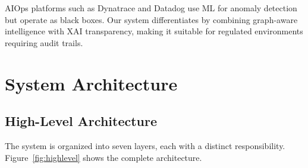 \documentclass[12pt,a4paper]{report}
\begin{document}
AIOps platforms such as Dynatrace and Datadog use ML for anomaly detection
but operate as black boxes. Our system differentiates by combining
graph-aware intelligence with XAI transparency, making it suitable for
regulated environments requiring audit trails.

\chapter{System Architecture}

\section{High-Level Architecture}

The system is organized into seven layers, each with a distinct
responsibility. Figure~\ref{fig:highlevel} shows the complete
architecture.
\end{document}
